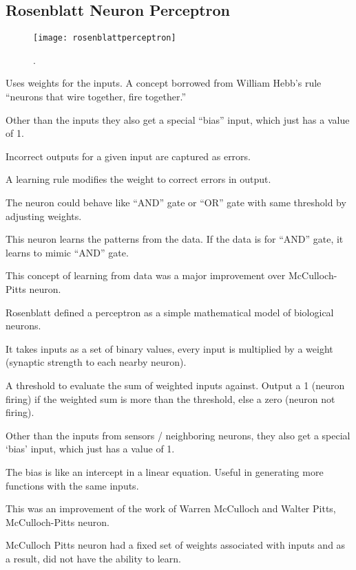 	\subsection{Rosenblatt Neuron Perceptron}
 	\begin{figure}[h]
		\centering
		\texttt{[image: rosenblattperceptron]}
		\caption{.}
		\label{fig:rosenblattperceptron}
	\end{figure}
	\begin{bulletedlist}
		\item Uses weights for the inputs.  A concept borrowed from William Hebb's rule ``neurons that wire together, fire together.''
		\item Other than the inputs they also get a special ``bias'' input, which just has a value of 1.
		\item Incorrect outputs for a given input are captured as errors.
		\item A learning rule modifies the weight to correct errors in output.
		\item The neuron could behave like ``AND'' gate or ``OR'' gate with same threshold by adjusting weights.
		\item This neuron learns the patterns from the data. If the data is for ``AND'' gate, it learns to mimic ``AND'' gate.
		\item This concept of learning from data was a major improvement over McCulloch-Pitts neuron.
		\item Rosenblatt defined a perceptron as a simple mathematical model of biological neurons.
		\item It takes inputs as a set of binary values, every input is multiplied by a weight (synaptic strength to each nearby neuron).
		\item A threshold to evaluate the sum of weighted inputs against. Output a 1 (neuron firing) if the weighted sum is more than the threshold, else a zero (neuron not firing).
		\item Other than the inputs from sensors / neighboring neurons, they also get a special `bias' input, which just has a value of 1.
		\item The bias is like an intercept in a linear equation.  Useful in generating more functions with the same inputs.
		\item This was an improvement of the work of Warren McCulloch and Walter Pitts, McCulloch-Pitts neuron.
		\item McCulloch Pitts neuron had a fixed set of weights associated with inputs and as a result, did not have the ability to learn.

\end{bulletedlist}
